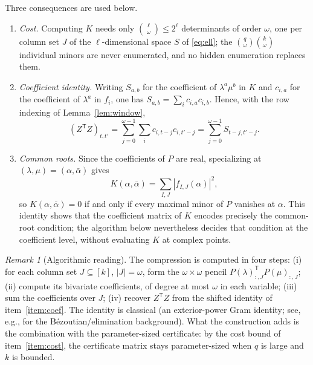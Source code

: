\documentclass[journal]{IEEEtran}
\theoremstyle{plainn}
\theoremstyle{remark}
\newtheorem{remark}{Remark}
\begin{document}
Three consequences are used below.
\begin{enumerate}[label=(\roman*)]
\item\label{item:cost} \emph{Cost.} Computing $K$ needs only
$\binom{\ell}{\omega}\le2^{\ell}$ determinants of order $\omega$, one per
column set $J$ of the $\ell$-dimensional space $S$ of \eqref{eq:ell}; the
$\binom q\omega\binom k\omega$ individual minors are never enumerated,
and no hidden enumeration replaces them.
\item\label{item:coef} \emph{Coefficient identity.} Writing $S_{a,b}$
for the coefficient of $\lambda^a\mu^b$ in $K$ and $c_{i,a}$ for the
coefficient of $\lambda^a$ in $f_i$, one has
$S_{a,b}=\sum_i c_{i,a}c_{i,b}$. Hence, with the row indexing of
Lemma~\ref{lem:window},
\begin{equation*}
(Z^{\mathsf T}Z)_{t,t'}
=\sum_{j=0}^{\omega-1}\sum_i c_{i,t-j}c_{i,t'-j}
=\sum_{j=0}^{\omega-1}S_{t-j,t'-j}.
\end{equation*}
\item\label{item:roots} \emph{Common roots.} Since the coefficients of
$P$ are real, specializing at $(\lambda,\mu)=(\alpha,\bar\alpha)$ gives
\begin{equation*}
K(\alpha,\bar\alpha)
=\sum_{I,J}\left|f_{I,J}(\alpha)\right|^2,
\end{equation*}
so $K(\alpha,\bar\alpha)=0$ if and only if every maximal minor of $P$
vanishes at $\alpha$. This identity shows that the coefficient matrix of
$K$ encodes precisely the common-root condition; the algorithm below
nevertheless decides that condition at the coefficient level, without
evaluating $K$ at complex points.
\end{enumerate}

\begin{remark}[Algorithmic reading]\label{rem:algo}
The compression is computed in four steps:
(i) for each column set $J\subseteq[k]$, $|J|=\omega$, form the
$\omega\times\omega$ pencil $P(\lambda)_{:,J}^{\mathsf T}P(\mu)_{:,J}$;
(ii) compute its bivariate coefficients, of degree at most $\omega$ in
each variable;
(iii) sum the coefficients over $J$;
(iv) recover $Z^{\mathsf T}Z$ from the shifted identity of
item~\ref{item:coef}.
The identity is classical (an exterior-power Gram identity; see, e.g.,
\cite{emi99} for the B\'ezoutian/elimination background). What the
construction adds is the combination with the parameter-sized
certificate: by the cost bound of item~\ref{item:cost}, the certificate
matrix stays parameter-sized when $q$ is large and $k$ is bounded.
\end{remark}
\end{document}
